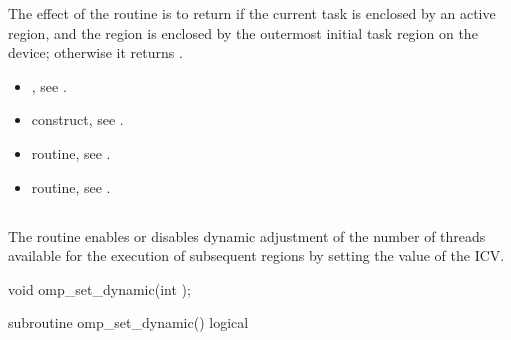\effect
The effect of the  routine is to return  if the current task is
enclosed by an active  region, and the  region is enclosed by the
outermost initial task region on the device; otherwise it returns .

\crossreferences
\begin{itemize}
\item {}, see
.

\item {} construct, see
.

\item {} routine, see
.

\item {} routine, see
.
\end{itemize}








\bigskip
\subsection{}
\label{subsec:omp_set_dynamic}
\summary
The  routine enables or disables dynamic adjustment of the
number of threads available for the execution of subsequent  regions by
setting the value of the  ICV.


\format
\begin{ccppspecific}
\begin{ompcFunction}
void omp_set_dynamic(int );
\end{ompcFunction}
\end{ccppspecific}
\bigskip

\begin{samepage}
\begin{fortranspecific}
\begin{ompfSubroutine}
subroutine omp_set_dynamic()
logical 
\end{ompfSubroutine}
\end{fortranspecific}
\end{samepage}

